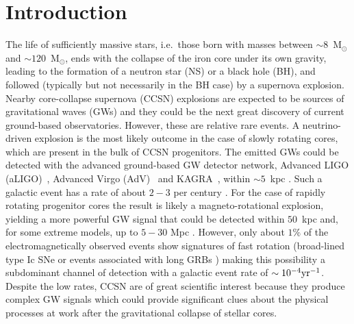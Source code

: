 
\section{Introduction}


The life of sufficiently massive stars, i.e.~those born with masses between $\sim 8$~M$_\odot$ and $\sim 120$~M$_\odot$, ends with the collapse of {the} iron core under {its} own gravity, leading {to} the formation of a neutron star {(NS)} or a black hole (BH), {and} followed (typically but not necessarily in the BH case) by {a supernova} explosion. Nearby core-collapse supernova (CCSN) explosions are expected to be sources of gravitational waves (GWs) and they could be 
the next great discovery of current ground-based observatories. However, these are relative rare events. A neutrino-driven explosion \citep{Bethe:1990} is the most likely outcome in the case of slowly rotating cores, which are present in the bulk of CCSN progenitors. The emitted GWs could be detected with the advanced ground-based GW detector network, Advanced LIGO (aLIGO)~\citep{TheLIGOScientific:2014jea}, Advanced Virgo (AdV)~\citep{TheVirgo:2014hva} and
KAGRA~\citep{Aso:2013eba}, within $\sim 5$~kpc \citep{Gossan:2016,TargetedSNSearchO12}. Such a galactic event has a rate of about $2-3$ per century \citep{Adams:2013,Rozwadowska:2021}.
For the case of rapidly rotating progenitor cores the result is likely a magneto-rotational explosion, yielding  a more powerful GW signal that could be detected within $50$~kpc and, for some extreme models, up to $5-30$ Mpc \citep{Gossan:2016,TargetedSNSearchO12}. However, only about $1\%$ of the electromagnetically observed events show signatures of fast rotation (broad-lined type Ic SNe \citep{Li:2011b} or events associated with long GRBs \citep{Chapman:2007}) making this possibility a subdominant channel of detection with a galactic event rate of $\sim 10^{-4} \rm{yr}^{-1}$.
Despite the low rates, CCSN are of great scientific interest because they produce complex GW signals which could provide significant clues about the physical processes at work after the gravitational collapse of stellar cores. 


